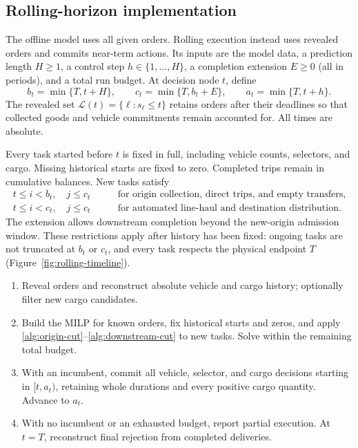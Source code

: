 \subsection{Rolling-horizon implementation}
\label{sec:method}

The offline model uses all given orders. Rolling execution instead uses
revealed orders and commits near-term actions. Its inputs are the model
data, a prediction length $H\ge1$, a control step $h\in\{1,\ldots,H\}$,
a completion extension $E\ge0$ (all in periods), and a total run budget.
At decision node $t$, define
\begin{equation}
 b_t=\min\{T,t+H\},\qquad c_t=\min\{T,b_t+E\},\qquad
 a_t=\min\{T,t+h\}.
 \label{alg:window}
\end{equation}
The revealed set $\mathcal L(t)=\{\ell:s_\ell\le t\}$ retains orders after
their deadlines so that collected goods and vehicle commitments remain
accounted for. All times are absolute.

Every task started before $t$ is fixed in full, including vehicle counts,
selectors, and cargo. Missing historical starts are fixed to zero.
Completed trips remain in cumulative balances. New tasks satisfy
\begin{align}
 t\leq i<b_t,\quad j\leq c_t
 &\qquad\text{for origin collection, direct trips, and empty transfers},
 \label{alg:origin-cut}\\
 t\leq i<c_t,\quad j\leq c_t
 &\qquad\text{for automated line-haul and destination distribution}.
 \label{alg:downstream-cut}
\end{align}
The extension allows downstream completion beyond the new-origin admission
window. These restrictions apply after history has been fixed: ongoing
tasks are not truncated at $b_t$ or $c_t$, and every task respects the
physical endpoint $T$ (Figure~\ref{fig:rolling-timeline}).

\begin{enumerate}
 \item Reveal orders and reconstruct absolute vehicle and cargo history;
       optionally filter new cargo candidates.
 \item Build the MILP for known orders, fix historical starts and zeros,
       and apply \eqref{alg:origin-cut}--\eqref{alg:downstream-cut} to new
       tasks. Solve within the remaining total budget.
 \item With an incumbent, commit all vehicle, selector, and cargo decisions
       starting in $[t,a_t)$, retaining whole durations and every positive
       cargo quantity. Advance to $a_t$.
 \item With no incumbent or an exhausted budget, report partial execution.
       At $t=T$, reconstruct final rejection from completed deliveries.
\end{enumerate}

